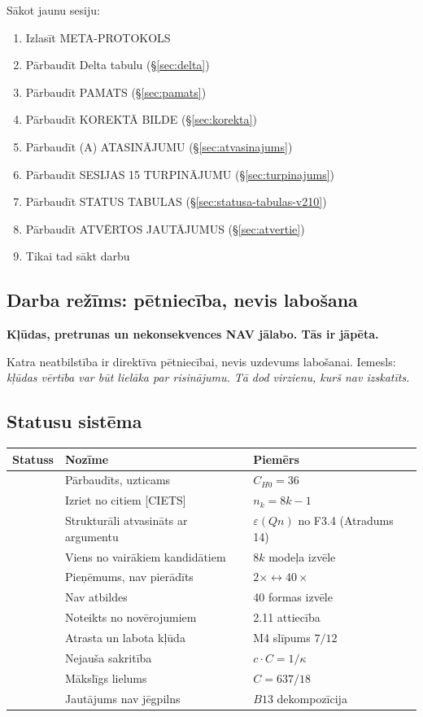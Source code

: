 \documentclass[12pt,a4paper]{article}
\begin{document}
Sākot jaunu sesiju:
\begin{enumerate}
    \item Izlasīt META-PROTOKOLS
    \item Pārbaudīt Delta tabulu (§\ref{sec:delta})
    \item Pārbaudīt PAMATS (§\ref{sec:pamats})
    \item Pārbaudīt KOREKTĀ BILDE (§\ref{sec:korekta})
    \item Pārbaudīt (A) ATASINĀJUMU (§\ref{sec:atvasinajums})
    \item Pārbaudīt SESIJAS 15 TURPINĀJUMU (§\ref{sec:turpinajums})
    \item Pārbaudīt STATUS TABULAS (§\ref{sec:statusa-tabulas-v210})
    \item Pārbaudīt ATVĒRTOS JAUTĀJUMUS (§\ref{sec:atvertie})
    \item Tikai tad sākt darbu
\end{enumerate}

\subsection*{Darba režīms: pētniecība, nevis labošana}

\textbf{Kļūdas, pretrunas un nekonsekvences NAV jālabo. Tās ir jāpēta.}

Katra neatbilstība ir direktīva pētniecībai, nevis uzdevums labošanai. Iemesls: \textit{kļūdas vērtība var būt lielāka par risinājumu. Tā dod virzienu, kurš nav izskatīts.}

\subsection*{Statusu sistēma}

\begin{table}[h]
\centering
\begin{tabular}{|l|l|l|}
\hline
\textbf{Statuss} & \textbf{Nozīme} & \textbf{Piemērs} \\
\hline
[CIETS] & Pārbaudīts, uzticams & $C_{H0} = 36$ \\
[SADERĪBA] & Izriet no citiem [CIETS] & $n_k = 8k-1$ \\
[SADERĪBA-strong] & Strukturāli atvasināts ar argumentu & $\varepsilon(Qn)$ no F3.4 (Atradums 14) \\
[SADERĪBA-kand.] & Viens no vairākiem kandidātiem & $8k$ modeļa izvēle \\
[HIPOTĒZE] & Pieņēmums, nav pierādīts & $2\times\leftrightarrow 40\times$ \\
[ATVĒRTS] & Nav atbildes & 40 formas izvēle \\
[EMPĪRISKS] & Noteikts no novērojumiem & 2.11 attiecība \\
[KĻŪDA] & Atrasta un labota kļūda & M4 slīpums $7/12$ \\
[NEJAUŠA] & Nejauša sakritība & $c\cdot C = 1/\kappa$ \\
[ARTEFAKTS] & Mākslīgs lielums & $C = 637/18$ \\
[NEJĒGPILNS] & Jautājums nav jēgpilns & $B13$ dekompozīcija \\
\hline
\end{tabular}
\end{table}
\end{document}
